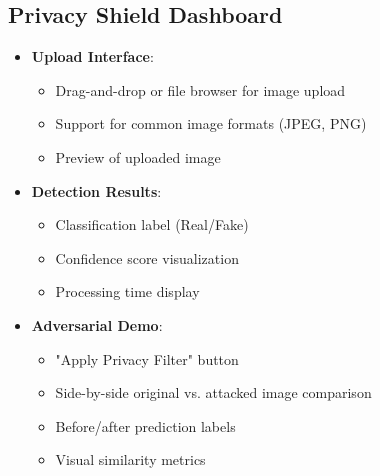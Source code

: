 \documentclass[a4paper,12pt]{article}
\begin{document}
\subsection{Privacy Shield Dashboard}
\begin{itemize}
    \item \textbf{Upload Interface}:
    \begin{itemize}
        \item Drag-and-drop or file browser for image upload
        \item Support for common image formats (JPEG, PNG)
        \item Preview of uploaded image
    \end{itemize}
    
    \item \textbf{Detection Results}:
    \begin{itemize}
        \item Classification label (Real/Fake)
        \item Confidence score visualization
        \item Processing time display
    \end{itemize}
    
    \item \textbf{Adversarial Demo}:
    \begin{itemize}
        \item "Apply Privacy Filter" button
        \item Side-by-side original vs. attacked image comparison
        \item Before/after prediction labels
        \item Visual similarity metrics
    \end{itemize}
\end{itemize}
\end{document}
